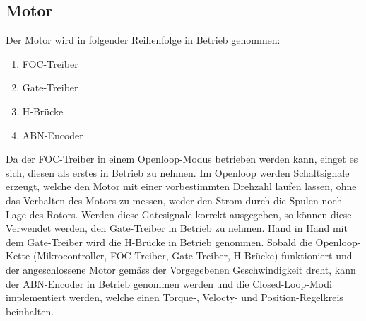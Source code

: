 \newpage
\subsection{Motor}
\label{subsec:Inbetriebnahme_Motor}

Der Motor wird in folgender Reihenfolge in Betrieb genommen:

\begin{enumerate}
\item FOC-Treiber
\item Gate-Treiber
\item H-Brücke
\item ABN-Encoder
\end{enumerate}

Da der FOC-Treiber in einem Openloop-Modus betrieben werden kann, einget es sich, diesen als erstes in Betrieb zu nehmen. Im Openloop werden Schaltsignale erzeugt, welche den Motor mit einer vorbestimmten Drehzahl laufen lassen, ohne das Verhalten des Motors zu messen, weder den Strom durch die Spulen noch Lage des Rotors. Werden diese Gatesignale korrekt ausgegeben, so können diese Verwendet werden, den Gate-Treiber in Betrieb zu nehmen. Hand in Hand mit dem Gate-Treiber wird die H-Brücke in Betrieb genommen. Sobald die Openloop-Kette (Mikrocontroller, FOC-Treiber, Gate-Treiber, H-Brücke) funktioniert und der angeschlossene Motor gemäss der Vorgegebenen Geschwindigkeit dreht, kann der ABN-Encoder in Betrieb genommen werden und die Closed-Loop-Modi implementiert werden, welche einen Torque-, Velocty- und Position-Regelkreis beinhalten.

